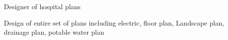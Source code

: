 \documentclass[letterpaper]{deedy-resume} %
\begin{document}
\begin{minipage}[t]{0.66\textwidth}
\sectionspace %


\begin{tightitemize}
\item {Designer of hospital plans}
\item Design of entire set of plans including electric, floor plan, Landscape plan, drainage plan, potable water plan 
\end{tightitemize}

\sectionspace %




\end{minipage} %








\end{document}
